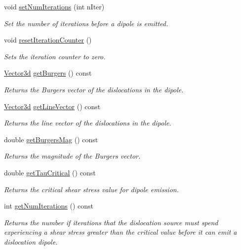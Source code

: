 \begin{DoxyCompactItemize}
void \hyperlink{classDislocationSource_a3042d73ee7ee346d825ab810dc5a6e83}{set\-Num\-Iterations} (int n\-Iter)
\begin{DoxyCompactList}\small\item\em Set the number of iterations before a dipole is emitted. \end{DoxyCompactList}\item 
void \hyperlink{classDislocationSource_a6dd6ad9fe448ce37152dfae4f3981ff0}{reset\-Iteration\-Counter} ()
\begin{DoxyCompactList}\small\item\em Sets the iteration counter to zero. \end{DoxyCompactList}\item 
\hyperlink{classVector3d}{Vector3d} \hyperlink{classDislocationSource_a47e3d707ffdecb9ecd7dd6dff47930c2}{get\-Burgers} () const 
\begin{DoxyCompactList}\small\item\em Returns the Burgers vector of the dislocations in the dipole. \end{DoxyCompactList}\item 
\hyperlink{classVector3d}{Vector3d} \hyperlink{classDislocationSource_ad47bab97726e7ec0591932d3f9f50271}{get\-Line\-Vector} () const 
\begin{DoxyCompactList}\small\item\em Returns the line vector of the dislocations in the dipole. \end{DoxyCompactList}\item 
double \hyperlink{classDislocationSource_ab272383ee903fa84f4f36104d13dfcb8}{get\-Burgers\-Mag} () const 
\begin{DoxyCompactList}\small\item\em Returns the magnitude of the Burgers vector. \end{DoxyCompactList}\item 
double \hyperlink{classDislocationSource_a570b0ddb54028fd59c6cdcc460b32a9b}{get\-Tau\-Critical} () const 
\begin{DoxyCompactList}\small\item\em Returns the critical shear stress value for dipole emission. \end{DoxyCompactList}\item 
int \hyperlink{classDislocationSource_a2e5651d778ff7d02f5db1529066542cc}{get\-Num\-Iterations} () const 
\begin{DoxyCompactList}\small\item\em Returns the number if iterations that the dislocation source must spend experiencing a shear stress greater than the critical value before it can emit a dislocation dipole. \end{DoxyCompactList}\item 

\end{DoxyCompactItemize}

